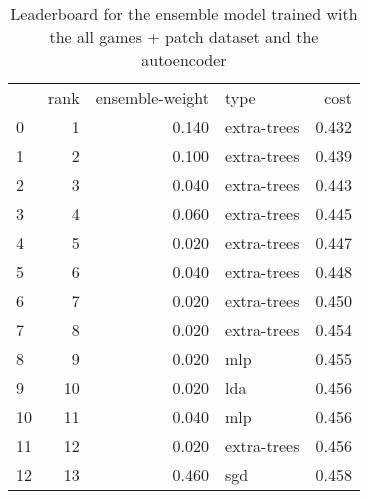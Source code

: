 \begin{table}[]
	\centering
	\begin{tabular}{lrrlr}
		   & rank & ensemble-weight & type        & cost  \\
		0  & 1    & 0.140           & extra-trees & 0.432 \\
		1  & 2    & 0.100           & extra-trees & 0.439 \\
		2  & 3    & 0.040           & extra-trees & 0.443 \\
		3  & 4    & 0.060           & extra-trees & 0.445 \\
		4  & 5    & 0.020           & extra-trees & 0.447 \\
		5  & 6    & 0.040           & extra-trees & 0.448 \\
		6  & 7    & 0.020           & extra-trees & 0.450 \\
		7  & 8    & 0.020           & extra-trees & 0.454 \\
		8  & 9    & 0.020           & mlp         & 0.455 \\
		9  & 10   & 0.020           & lda         & 0.456 \\
		10 & 11   & 0.040           & mlp         & 0.456 \\
		11 & 12   & 0.020           & extra-trees & 0.456 \\
		12 & 13   & 0.460           & sgd         & 0.458 \\
	\end{tabular}

	\caption{Leaderboard for the ensemble model trained with the all games + patch dataset and the autoencoder}
	\label{tab:lb-all-games-with-patch-autoencode}
\end{table}

